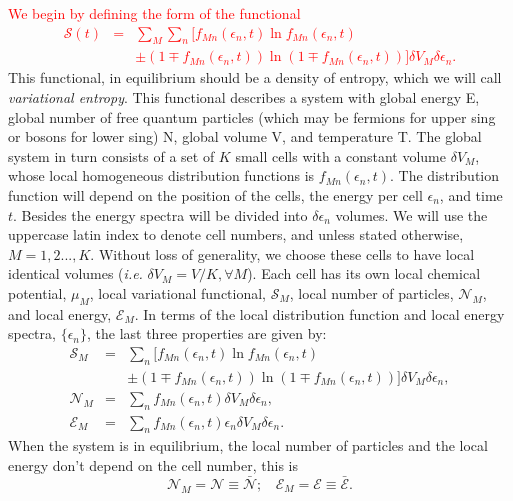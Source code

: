 \documentclass{article}
\newcommand{\Sm}{\Ss_M}
\newcommand{\de}{\delta}
\newcommand{\Ss}{\mathcal{S}}
\begin{document}
\textcolor{red}{We begin by defining the form of the functional 
\begin{eqnarray}
    \Ss (t)&=&\sum_{M} \sum_{n} [ f_{Mn}(\epsilon_{n},t) \ln f_{Mn}(\epsilon_{n},t)\nonumber \\
    &&\pm (1 \mp f_{Mn}(\epsilon_{n},t)) \ln (1 \mp f_{Mn}(\epsilon_{n},t)) ]   \delta V_M \delta \epsilon_n \label{entropy}.
\end{eqnarray}}
This functional, in equilibrium should be a density of entropy, which we will call \textit{variational entropy}.
This functional describes a system with global energy E, global number of free
quantum particles (which may be fermions for upper sing or bosons for lower sing) N, global volume V, and temperature T. The
global system in turn consists of a set of $K$ small cells with a constant volume $\delta V_M$, whose local homogeneous distribution functions is $f_{Mn}(\epsilon_{n},t)$. The distribution function will depend on the position of the cells, the energy per cell $\epsilon_{n}$, and time $t$. Besides the energy spectra will be divided into $\delta \epsilon_n$ volumes. We will use the uppercase latin index to denote cell numbers, and unless stated otherwise, $M = 1, 2 . . . , K$. Without loss of generality, we choose these cells to have
local identical volumes (\textit{i.e.} $\delta V_M = V/K, \forall M$). Each cell has its own local chemical potential, $\mu_M$, local
variational functional, $\Sm$, local number of particles, $\mathcal{N}_M$, and local energy, $\mathcal{E}_M$. In terms of the local distribution 
function and local energy spectra, $\{\epsilon_{n}\}$, the last three properties are given by:
\begin{eqnarray}
    \Sm &=&  \sum_{n} [ f_{Mn}(\epsilon_{n},t) \ln f_{Mn}(\epsilon_{n},t)\nonumber \\
    &&\pm (1 \mp f_{Mn}(\epsilon_{n},t)) \ln (1 \mp f_{Mn}(\epsilon_{n},t)) ] \de V_M \delta \epsilon_n \label{entropycell},\\
    {\mathcal{N}}_M&=& \sum_{n}f_{Mn}(\epsilon_{n} ,t) \de V_M \delta \epsilon_n, \nonumber \\
{\mathcal{E}}_M&=& \sum_{n}f_{Mn}(\epsilon_{n},t)\epsilon_{n} \de V_M \delta \epsilon_n.
\end{eqnarray}
When the system is in equilibrium, the local number of particles and the local energy don't depend on the cell number, this is
\begin{equation}
   {\mathcal{N}}_M=\mathcal{N}\equiv \bar{\mathcal{N}}; \ \ \ \  {\mathcal{E}}_M=\mathcal{E}\equiv \bar{\mathcal{E}}.
\end{equation}
\end{document}
